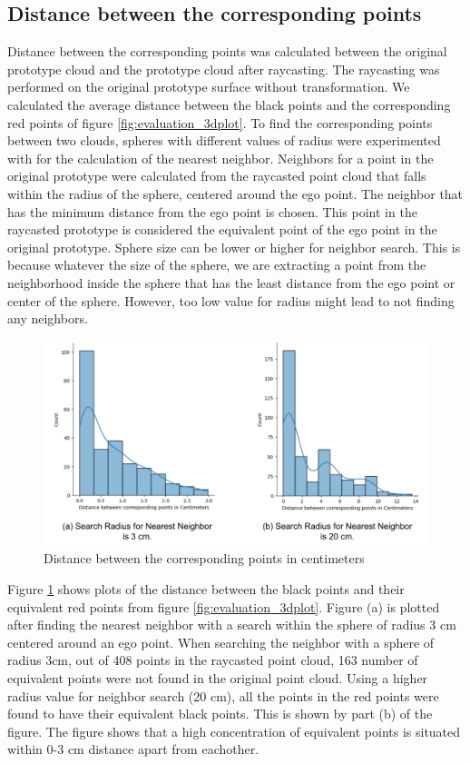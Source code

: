 \subsection{Distance between the corresponding points}
Distance between the corresponding points was calculated between the original prototype cloud and the prototype cloud after raycasting. The raycasting was performed on the original prototype surface without transformation. We calculated the average distance between the black points and the corresponding red points of figure \ref{fig:evaluation_3dplot}. To find the corresponding points between two clouds, spheres with different values of radius were experimented with for the calculation of the nearest neighbor. Neighbors for a point in the original prototype were calculated from the raycasted point cloud that falls within the radius of the sphere, centered around the ego point. The neighbor that has the minimum distance from the ego point is chosen. This point in the raycasted prototype is considered the equivalent point of the ego point in the original prototype. Sphere size can be lower or higher for neighbor search. This is because whatever the size of the sphere, we are extracting a point from the neighborhood inside the sphere that has the least distance from the ego point or center of the sphere. However, too low value for radius might lead to not finding any neighbors.
\begin{figure}[htbp]
    \centering
    \includegraphics[width=1\linewidth]{97_graphics/evaluation/distn_betn_corresponding_points_in_raycasting.pdf}
    \caption{Distance between the corresponding points in centimeters}
    \label{fig:evaluation_distn_corresponding_points}
\end{figure}

Figure \ref{fig:evaluation_distn_corresponding_points} shows plots of the distance between the black points and their equivalent red points from figure \ref{fig:evaluation_3dplot}. Figure (a) is plotted after finding the nearest neighbor with a search within the sphere of radius 3 cm centered around an ego point. When searching the neighbor with a sphere of radius 3cm, out of 408 points in the raycasted point cloud, 163 number of equivalent points were not found in the original point cloud. Using a higher radius value for neighbor search (20 cm), all the points in the red points were found to have their equivalent black points. This is shown by part (b) of the figure. The figure shows that a high concentration of equivalent points is situated within 0-3 cm distance apart from eachother.

